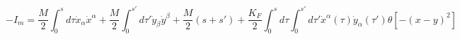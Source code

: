 \begin{equation}
\label{propaction}
-I_m=\frac{M}{2}\int_0^{s}d\tau \dot{x}_{\alpha}\dot{x}^{\alpha}+\frac{M}{2}\int_0^{s'}d\tau '\dot{y}_{\beta}\dot{y}^{\beta}+\frac{M}{2}(s+s')+\frac{K_F}{2}\int_0^sd\tau \int_0^{s'}d\tau' \dot{x}^{\alpha}(\tau )\dot{y}_{\alpha}(\tau')\theta [-(x-y)^2]
\end{equation}

